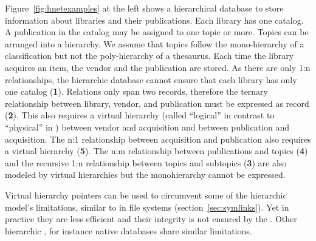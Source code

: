 Figure~\ref{fig:hnetexamples} at the left shows a hierarchical database to
store information about libraries and their publications. Each {\ormtext
library} has one {\ormtext catalog}. A {\ormtext publication} in the catalog may
be assigned to one {\ormtext topic} or more. Topics can be arranged into a
hierarchy. We assume that topics follow the mono-hierarchy of a classification
but not the poly-hierarchy of a thesaurus. Each time the library acquires an
item, the {\ormtext vendor} and the {\ormtext publication} are stored.
As there are only 1:n relationships, the hierarchic database cannot ensure
that each library has only one catalog ({\ormtext\small\textbf 1}).
Relations only span two records, therefore the ternary relationship between
library, vendor, and publication must be expressed as record
({\ormtext\small\textbf 2}). This also requires a virtual hierarchy
(called ``logical'' in contrast to ``physical'' in ) between vendor
and acquisition and between publication and acquisition. The n:1 relationship
between acquisition and publication also requires a virtual hierarchy
({\ormtext\small\textbf 5}). The n:m relationship between publications and
topics ({\ormtext\small\textbf 4}) and the recursive 1:n relationship between
topics and subtopics ({\ormtext\small\textbf 3}) are also modeled by virtual
hierarchies but the monohierarchy cannot be expressed.

Virtual hierarchy pointers can be used to circumvent some of the hierarchic
model's limitations, similar to  in file systems
(section~\ref{sec:symlinks}). Yet in practice they are less efficient and
their integrity is not ensured by the . Other hierarchic
, for instance native  databases share similar
limitations.


